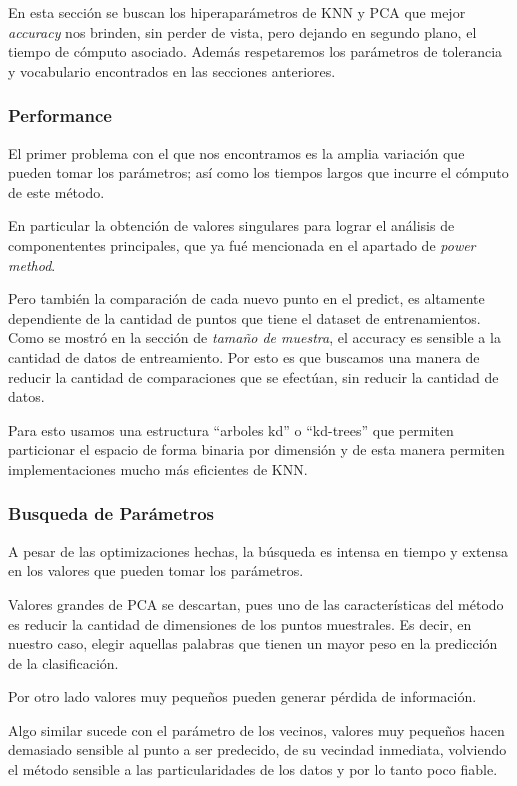 En esta sección se buscan los hiperaparámetros de KNN y PCA que mejor
\emph{accuracy} nos brinden, sin perder de vista, pero dejando en segundo
plano, el tiempo de cómputo asociado. Además respetaremos los
parámetros de tolerancia y vocabulario encontrados en las secciones
anteriores.

\subsubsection{Performance}

El primer problema con el que nos encontramos es la amplia variación
que pueden tomar los parámetros; así como los tiempos largos que
incurre el cómputo de este método.

En particular la obtención de valores singulares para lograr el
análisis de componententes principales, que ya fué mencionada en el
apartado de \emph{power method}.

Pero también la comparación de cada nuevo punto en el predict, es
altamente dependiente de la cantidad de puntos que tiene el dataset de
entrenamientos. Como se mostró en la sección de \emph{tamaño de
  muestra}, el accuracy es sensible a la cantidad de datos de
entreamiento. Por esto es que buscamos una manera de reducir la
cantidad de comparaciones que se efectúan, sin reducir la cantidad de
datos.

Para esto usamos una estructura ``arboles kd'' o ``kd-trees'' que
permiten particionar el espacio de forma binaria por dimensión y de
esta manera permiten implementaciones mucho más eficientes de KNN.

\subsubsection{Busqueda de Parámetros}

A pesar de las optimizaciones hechas, la búsqueda es intensa en tiempo
y extensa en los valores que pueden tomar los parámetros.

Valores grandes de PCA se descartan, pues uno de las características
del método es reducir la cantidad de dimensiones de los puntos
muestrales. Es decir, en nuestro caso, elegir aquellas palabras que
tienen un mayor peso en la predicción de la clasificación.

Por otro lado valores muy pequeños pueden generar pérdida de información.

Algo similar sucede con el parámetro de los vecinos, valores muy
pequeños hacen demasiado sensible al punto a ser predecido, de su
vecindad inmediata, volviendo el método sensible a las
particularidades de los datos y por lo tanto poco fiable.

